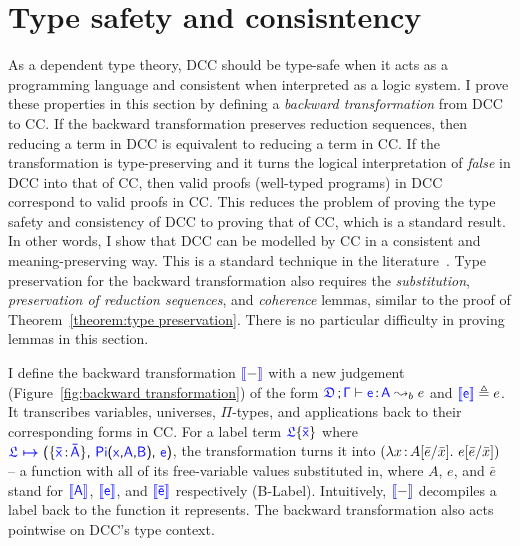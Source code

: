 
\section{Type safety and consisntency}
\label{sec:5.2}

As a dependent type theory, DCC should be type-safe when it acts as a programming language and consistent when interpreted as a logic system. I prove these properties in this section by defining a \textit{backward transformation} from DCC to CC. If the backward transformation preserves reduction sequences, then reducing a term in DCC is equivalent to reducing a term in CC. If the transformation is type-preserving and it turns the logical interpretation of \textit{false} in DCC into that of CC, then valid proofs (well-typed programs) in DCC correspond to valid proofs in CC. This reduces the problem of proving the type safety and consistency of DCC to proving that of CC, which is a standard result. In other words, I show that DCC can be modelled by CC in a consistent and meaning-preserving way. This is a standard technique in the literature~\cite{DBLP:conf/cpp/BoulierPT17,DBLP:conf/pldi/BowmanA18}. Type preservation for the backward transformation also requires the \textit{substitution}, \textit{preservation of reduction sequences}, and \textit{coherence} lemmas, similar to the proof of Theorem~\ref{theorem:type preservation}.
There is no particular difficulty in proving lemmas in this section. 

I define the backward transformation $\bluebr{-}$ with a new judgement (Figure~\ref{fig:backward transformation}) of the form $\targetcon \vdash \itemtype{e}{A} \leadsto_b e$ and $\bluebr{\target{e}} \triangleq e$. It transcribes variables, universes, $\Pi$-types, and applications back to their corresponding forms in CC. For a label term $\targetlab{\flabel}{\bar{x}}$ where 
$\itemdef{\target{\flabel}}{\itemtype{\bar{x}}{\bar{A}}}{\targetpi{x}{A}{B}}{\target{e}}$, the transformation turns it into 
$(\lambda x\hspace{0.5mm}{:}\hspace{0.5mm} A[\bar{e}\slash\bar{x}].\ e[\bar{e}\slash\bar{x}])$ -- a function with all of its free-variable values substituted in, where $A$, $e$, and $\bar{e}$ stand for $\bluebr{\target{A}}$, $\bluebr{\target{e}}$, and $\bluebr{\target{\bar{e}}}$ respectively (B-Label). Intuitively, $\bluebr{-}$ decompiles a label back to the function it represents. The backward transformation also acts pointwise on DCC's type context.

